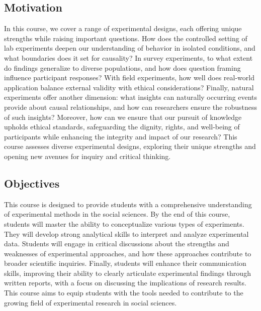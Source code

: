 \documentclass[letterpaper]{article}
\begin{document}

\subsection*{Motivation}


In this course, we cover a range of experimental designs, each offering unique strengths while raising important questions. How does the controlled setting of lab experiments deepen our understanding of behavior in isolated conditions, and what boundaries does it set for causality? In survey experiments, to what extent do findings generalize to diverse populations, and how does question framing influence participant responses? With field experiments, how well does real-world application balance external validity with ethical considerations? Finally, natural experiments offer another dimension: what insights can naturally occurring events provide about causal relationships, and how can researchers ensure the robustness of such insights? Moreover, how can we ensure that our pursuit of knowledge upholds ethical standards, safeguarding the dignity, rights, and well-being of participants while enhancing the integrity and impact of our research? This course assesses diverse experimental designs, exploring their unique strengths and opening new avenues for inquiry and critical thinking.


\subsection*{Objectives}

This course is designed to provide students with a comprehensive understanding of experimental methods in the social sciences. By the end of this course, students will master the ability to conceptualize various types of experiments. They will develop strong analytical skills to interpret and analyze experimental data. Students will engage in critical discussions about the strengths and weaknesses of experimental approaches, and how these approaches contribute to broader scientific inquiries. Finally, students will enhance their communication skills, improving their ability to clearly articulate experimental findings through written reports, with a focus on discussing the implications of research results. This course aims to equip students with the tools needed to contribute to the growing field of experimental research in social sciences.
\end{document}
